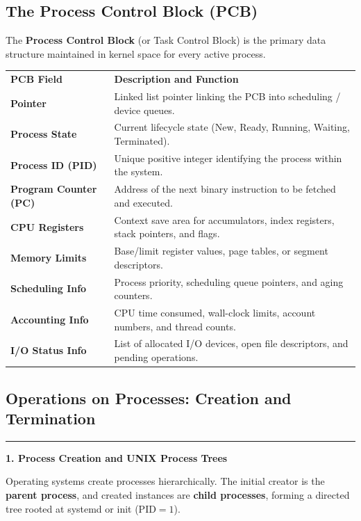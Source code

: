 \documentclass[11pt,a4paper]{article}
\newcommand{\ic}[1]{\mbox{\colorbox{AnthCodeBG}{\footnotesize\ttfamily\textcolor{AnthBlue}{#1}}}}
\newcommand{\concept}[1]{%
  \noindent\textcolor{AnthGreen}{\rule{3pt}{10pt}}\enspace
  \textbf{\color{AnthDark}#1}\par\vspace{2pt}%
}
\begin{document}
\subsection{The Process Control Block (PCB)}

The \textbf{Process Control Block} (or Task Control Block) is the primary data structure maintained in kernel space for every active process.

\begin{center}
\begin{tabularx}{0.88\linewidth}{L{3.8cm} X}
  \color{white}\textbf{PCB Field} & \color{white}\textbf{Description and Function} \\
  \textbf{Pointer} & Linked list pointer linking the PCB into scheduling / device queues. \\
  \textbf{Process State} & Current lifecycle state (\ic{New}, \ic{Ready}, \ic{Running}, \ic{Waiting}, \ic{Terminated}). \\
  \textbf{Process ID (PID)} & Unique positive integer identifying the process within the system. \\
  \textbf{Program Counter (PC)} & Address of the next binary instruction to be fetched and executed. \\
  \textbf{CPU Registers} & Context save area for accumulators, index registers, stack pointers, and flags. \\
  \textbf{Memory Limits} & Base/limit register values, page tables, or segment descriptors. \\
  \textbf{Scheduling Info} & Process priority, scheduling queue pointers, and aging counters. \\
  \textbf{Accounting Info} & CPU time consumed, wall-clock limits, account numbers, and thread counts. \\
  \textbf{I/O Status Info} & List of allocated I/O devices, open file descriptors, and pending operations. \\
\end{tabularx}
\end{center}

\subsection{Operations on Processes: Creation and Termination}

\concept{1. Process Creation and UNIX Process Trees}
Operating systems create processes hierarchically. The initial creator is the \textbf{parent process}, and created instances are \textbf{child processes}, forming a directed tree rooted at \ic{systemd} or \ic{init} ($\text{PID}=1$).
\end{document}
